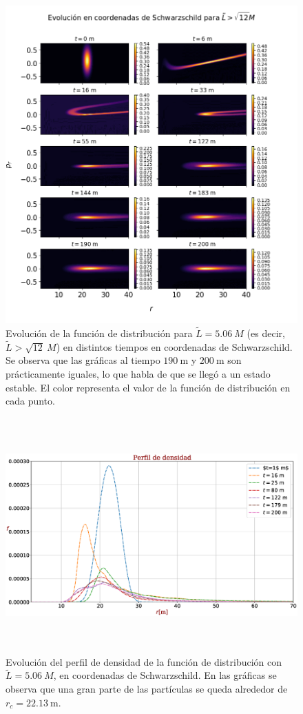 \documentclass[11pt,twoside,openright,spanish]{report}
\numberwithin{equation}{chapter}
\numberwithin{figure}{chapter}
\numberwithin{table}{chapter}
\begin{document}
\newpage
\begin{figure}[H]
	\centering
	\includegraphics[width=\textwidth,height=\textheight,keepaspectratio]{graphs_study/LmayorSchGraphs/evolutionSchMayor.png}
	\caption{Evolución de la función de distribución para $\tilde{L}=5.06\ M$ (es decir, $\tilde{L}>\sqrt{12}\ M$) en distintos tiempos en coordenadas de Schwarzschild. Se observa que las gráficas al tiempo $190\ \text{m}$ y $200\ \text{m}$ son prácticamente iguales, lo que habla de que se llegó a un estado estable. El color representa el valor de la función de distribución en cada punto.}
	\label{evolutionLmayorSch}
\end{figure}

\begin{figure}[H]
	\centering
	\includegraphics[height=9cm]{graphs_study/LmayorSchGraphs/densityProfileLmayorSch}
	\caption{Evolución del perfil de densidad de la función de distribución con $\tilde{L}=5.06\ M$, en coordenadas de Schwarzschild. En las gráficas se observa que una gran parte de las partículas se queda alrededor de $r_c=22.13\ \text{m}$.}
	\label{densityProfileSchLmayor}
\end{figure}
\end{document}
